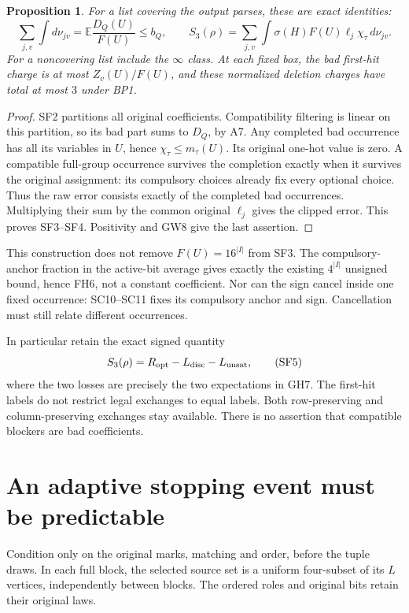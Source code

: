 \documentclass[11pt]{article}
\newtheorem{proposition}{Proposition}
\newcommand{\E}{\mathbb E}
\begin{document}
\begin{proposition}
For a list covering the output parses, these are exact identities:
\[
 \sum_{j,v}\int d\nu_{jv}
       =\E\frac{D_Q(U)}{F(U)}\le b_Q,\qquad
 S_3(\rho)=\sum_{j,v}\int
                \sigma(H)F(U)\ell_j\chi_\tau\,d\nu_{jv}.          \tag{SF4}
\]
For a noncovering list include the $\infty$ class. At each fixed box,
the bad first-hit charge is at most $Z_v(U)/F(U)$, and these
normalized deletion charges have total at most $3$ under BP1.
\end{proposition}
\begin{proof}
SF2 partitions all original coefficients. Compatibility filtering
is linear on this partition, so its bad part sums to $D_Q$, by A7.
Any completed bad occurrence has all its variables in $U$, hence
$\chi_\tau\le m_\tau(U)$. Its original one-hot value is zero.
A compatible full-group occurrence survives the completion exactly
when it survives the original assignment: its compulsory choices
already fix every optional choice. Thus the raw error consists
exactly of the completed bad occurrences. Multiplying their sum
by the common original $\ell_j$ gives the clipped error.
This proves SF3--SF4. Positivity and GW8 give the last assertion.
\end{proof}

This construction does not remove $F(U)=16^{|I|}$ from SF3.
The compulsory-anchor fraction in the active-bit average gives
exactly the existing $4^{|I|}$ unsigned bound, hence FH6, not a
constant coefficient. Nor can the sign cancel inside one fixed
occurrence: SC10--SC11 fixes its compulsory anchor and sign.
Cancellation must still relate different occurrences.

In particular retain the exact signed quantity
\[
 S_3(\rho)=R_{\rm opt}-L_{\rm disc}-L_{\rm unsat},                 \tag{SF5}
\]
where the two losses are precisely the two expectations in GH7.
The first-hit labels do not restrict legal exchanges to equal labels.
Both row-preserving and column-preserving exchanges stay available.
There is no assertion that compatible blockers are bad coefficients.

\section{An adaptive stopping event must be predictable}
Condition only on the original marks, matching and order, before
the tuple draws. In each full block, the selected source set is a
uniform four-subset of its $L$ vertices, independently between blocks.
The ordered roles and original bits retain their original laws.
\end{document}
